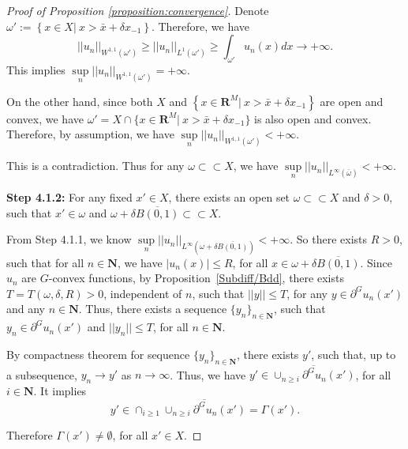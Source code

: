 \documentclass[a4paper, 11pt]{amsart}
\numberwithin{equation}{section}
\theoremstyle{plain}
\theoremstyle{definition}
\theoremstyle{remark}
\newcommand{\R}{\mathbf{R}}
\newcommand{\N}{\mathbf{N}}
\begin{document}
\begin{proof}[Proof of Proposition \ref{proposition:convergence}]
	Denote $\omega' := \left\{x\in X|~ x>\bar{x}+\delta x_{-1}\right\}$. Therefore, we have $$||u_n||_{W^{1,1}(\omega')} \ge ||u_n||_{L^{1}(\omega')} \ge \int_{\omega'} u_n(x) dx \longrightarrow +\infty.$$ This implies $\sup\limits_{n} ||u_n||_{W^{1,1}(\omega')} = +\infty$.
	
	On the other hand, since both $X$ and $\left\{x\in \R^M|~ x> \bar{x}+\delta x_{-1} \right\}$ are open and convex, we have  $\omega' = X \cap \{x\in \R^M|~ x> \bar{x}+\delta x_{-1} \}$ is also open and convex. Therefore, by assumption, we have $\sup\limits_{n} ||u_n||_{W^{1,1}(\omega')} < +\infty.$ 
	
	This is a contradiction. Thus for any $\omega \subset \subset X$, we have $\sup\limits_{n}||u_n||_{L^{\infty}(\bar{\omega})}<+\infty$.\medskip
	
	{\bf Step 4.1.2:} For any fixed $x'\in X$, there exists an open set $\omega \subset \subset X$ and $\delta>0$, such that $x'\in \omega$ and $\omega + \delta \overline{B(0,1)} \subset \subset X$.
	
	From Step 4.1.1, we know  $\sup\limits_{n}||u_n||_{L^{\infty}\left(\omega + \delta \overline{B(0,1)}\right)} < +\infty$. 
	So there exists $R>0$, such that for all $n\in \N$, we have $|u_n(x)|\le R$, for all $x \in \omega + \delta \overline{B(0,1)}$. Since $u_n$ are $G$-convex functions, by Proposition~\ref{Subdiff/Bdd}, there exists $T = T(\omega, \delta, R) >0$, independent of $n$, such that $||y||\le T$, for any $y \in \partial^G u_n(x')$ and any $n\in \N$. Thus, there exists a sequence $\{y_n\}_{n\in \N}$, such that $y_n \in \partial^G u_n(x')$ and $||y_n||\le T$, for all $n\in \N$.
	
	By compactness theorem for sequence $\{y_n\}_{n\in \N}$,  there exists $y'$, such that, up to a subsequence, $y_n \longrightarrow y'$ as $n \longrightarrow \infty$. Thus, we have $y' \in \overline{\cup_{n\ge i}\partial^G u_n(x')}$, for all $i\in \N$. It implies $$y' \in \cap_{i\ge 1} \overline{\cup_{n\ge i}\partial^G u_n(x')} = \Gamma (x').$$ 
	
	Therefore $\Gamma(x') \neq \emptyset$, for all $x' \in X$.\medskip
	
	

\end{proof}
\end{document}
